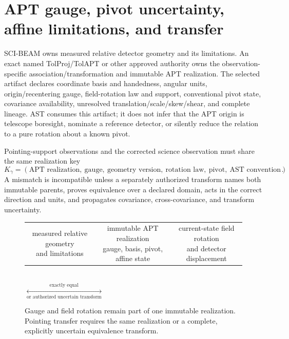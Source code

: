 \documentclass[10pt]{article}
\begin{document}
\newpage
\section{APT gauge, pivot uncertainty, affine limitations, and transfer}
SCI-BEAM owns measured relative detector geometry and its limitations. An
exact named TolProj/TolAPT or other approved authority owns the
observation-specific association/transformation and immutable APT realization.
The selected artifact declares coordinate basis and handedness, angular units,
origin/recentering gauge, field-rotation law and support, conventional pivot
state, covariance availability, unresolved translation/scale/skew/shear, and
complete lineage. AST consumes this artifact; it does not infer that the APT
origin is telescope boresight, nominate a reference detector, or silently
reduce the relation to a pure rotation about a known pivot.

Pointing-support observations and the corrected science observation must share
the same realization key
\begin{equation*}
 K_\gamma=(\text{APT realization},\ \text{gauge},\ \text{geometry version},
 \ \text{rotation law},\ \text{pivot},\ \text{AST convention}).
\end{equation*}
A mismatch is incompatible unless a separately authorized transform names
both immutable parents, proves equivalence over a declared domain, acts in the
correct direction and units, and propagates covariance, cross-covariance, and
transform uncertainty.

\begin{figure}[!ht]
\centering
\begin{tabular}{c@{\quad$\longrightarrow$\quad}c@{\quad$\longrightarrow$\quad}c}
\fcolorbox{astnavy}{astblue}{\parbox{0.23\linewidth}{\centering measured
relative geometry\\and limitations}} &
\fcolorbox{astnavy}{astgreen}{\parbox{0.28\linewidth}{\centering immutable APT
realization\\gauge, basis, pivot, affine state}} &
\fcolorbox{astnavy}{astgold}{\parbox{0.23\linewidth}{\centering current-state
field rotation\\and detector displacement}}
\end{tabular}\\[12pt]
\quad
$\underset{\text{or authorized uncertain transform}}{\overset{\text{exactly equal}}{\longleftrightarrow}}$\quad
{}
\caption{Gauge and field rotation remain part of one immutable realization.
Pointing transfer requires the same realization or a complete, explicitly
uncertain equivalence transform.}
\label{fig:gauge}
\end{figure}
\end{document}
